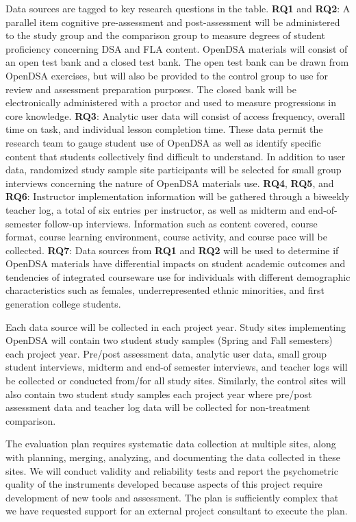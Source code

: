 \documentclass[11pt]{article}
\begin{document}
Data sources are tagged to key research questions in the table.
\textbf{RQ1} and \textbf{RQ2}:
A parallel item cognitive pre-assessment and post-assessment will be
administered to the study group and the comparison group to measure
degrees of student proficiency concerning DSA and FLA content.
OpenDSA materials will consist of an open test bank and a
closed test bank.
The open test bank can be drawn from OpenDSA exercises, but will
also be provided to the control group to use for review and
assessment preparation purposes.
The closed bank will be electronically administered with a
proctor and used to measure progressions in core knowledge.
\textbf{RQ3}: Analytic user data will consist of access frequency,
overall time on task, and individual lesson completion time.
These data permit the research team to gauge student use
of OpenDSA as well as identify specific content that
students collectively find difficult to understand.
In addition to user data, randomized study sample site
participants will be selected for small group interviews concerning
the nature of OpenDSA materials use.
\textbf{RQ4}, \textbf{RQ5}, and \textbf{RQ6}:
Instructor implementation information will be gathered through a
biweekly teacher log, a total of six entries per instructor, as well
as midterm and end-of-semester follow-up interviews.
Information such as content covered, course format, course learning
environment, course activity, and course pace will be collected.
\textbf{RQ7}: Data sources from \textbf{RQ1} and \textbf{RQ2}
will be used to determine if OpenDSA materials have differential
impacts on student academic outcomes and tendencies of integrated
courseware use for individuals with different demographic
characteristics such as females, underrepresented ethnic minorities,
and first generation college students.

Each data source will be collected in each project year.
Study sites implementing OpenDSA will contain two student study
samples (Spring and Fall semesters) each project year.
Pre/post assessment data, analytic user data, small group student
interviews, midterm and end-of semester interviews, and teacher logs
will be collected or conducted from/for all study sites.
Similarly, the control sites will also contain two student study
samples each project year where pre/post assessment data and teacher
log data will be collected for non-treatment comparison.

The evaluation plan requires systematic data collection at multiple
sites, along with planning, merging, analyzing, and documenting the
data collected in these sites.
We will conduct validity and reliability tests and report the
psychometric quality of the instruments developed because aspects of
this project require development of new tools and assessment.
The plan is sufficiently complex that we have requested support for an
external project consultant to execute the plan.
\end{document}
